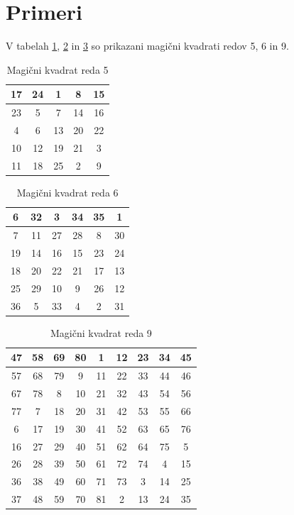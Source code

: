 \documentclass[a4paper,12pt]{article}
\begin{document}

\section{Primeri}

V tabelah \ref{table:mag5}, \ref{table:mag6} in \ref{table:mag9} so prikazani
magični kvadrati redov 5, 6 in 9.

\begin{table}[h!]
   \centering
   \caption{Magični kvadrat reda 5}
   \label{table:mag5}
   \begin{tabular}{|c|c|c|c|c|}
   \hline
   17 & 24 &  1 &  8 & 15 \\\hline
   23 &  5 &  7 & 14 & 16 \\\hline
   4 &  6 & 13 & 20 & 22 \\\hline
   10 & 12 & 19 & 21 &  3 \\\hline
   11 & 18 & 25 &  2 &  9 \\\hline
   \end{tabular}
\end{table}

\newpage

\begin{table}[h!]
   \centering
   \caption{Magični kvadrat reda 6}
   \label{table:mag6}
   \begin{tabular}{|c|c|c|c|c|c|}
   \hline
   6 & 32 &  3 & 34 & 35 &  1 \\\hline
   7 & 11 & 27 & 28 &  8 & 30 \\\hline
   19 & 14 & 16 & 15 & 23 & 24 \\\hline
   18 & 20 & 22 & 21 & 17 & 13 \\\hline
   25 & 29 & 10 &  9 & 26 & 12 \\\hline
   36 &  5 & 33 &  4 &  2 & 31 \\\hline
   \end{tabular}
\end{table}

\begin{table}[h!]
   \centering
   \caption{Magični kvadrat reda 9}
   \label{table:mag9}
   \begin{tabular}{|c|c|c|c|c|c|c|c|c|}
   \hline
   47 & 58 & 69 & 80 &  1 & 12 & 23 & 34 & 45 \\\hline
   57 & 68 & 79 &  9 & 11 & 22 & 33 & 44 & 46 \\\hline
   67 & 78 &  8 & 10 & 21 & 32 & 43 & 54 & 56 \\\hline
   77 &  7 & 18 & 20 & 31 & 42 & 53 & 55 & 66 \\\hline
    6 & 17 & 19 & 30 & 41 & 52 & 63 & 65 & 76 \\\hline
   16 & 27 & 29 & 40 & 51 & 62 & 64 & 75 &  5 \\\hline
   26 & 28 & 39 & 50 & 61 & 72 & 74 &  4 & 15 \\\hline
   36 & 38 & 49 & 60 & 71 & 73 &  3 & 14 & 25 \\\hline
   37 & 48 & 59 & 70 & 81 &  2 & 13 & 24 & 35 \\\hline
   \end{tabular}
\end{table}
\end{document}
